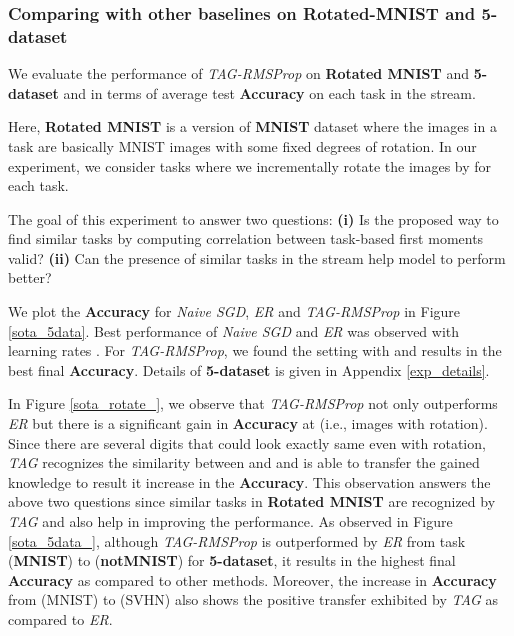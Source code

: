 \documentclass{article} \usepackage{collas2022_conference,times}
\begin{document}
    
\subsubsection{Comparing with other baselines on Rotated-MNIST and 5-dataset}\label{5data_rotated}
We evaluate the performance of \textit{TAG-RMSProp} on \textbf{Rotated MNIST}  and \textbf{5-dataset} and in terms of average test \textbf{Accuracy} on each task in the stream. 

Here, \textbf{Rotated MNIST} \citep{lopez2017gradient} is a version of \textbf{MNIST} dataset \citep{mnist} where the images in a task are basically MNIST images with some fixed degrees of rotation. In our experiment, we consider  tasks where we incrementally rotate the images by  for each task. 

The goal of this experiment to answer two questions: \textbf{(i)} Is the proposed way to find similar tasks by computing correlation between task-based first moments valid? \textbf{(ii)} Can the presence of similar tasks in the stream help model to perform better? 

We plot the \textbf{Accuracy} for \textit{Naive SGD}, \textit{ER} and \textit{TAG-RMSProp} in Figure \ref{sota_5data}. Best performance of \textit{Naive SGD} and \textit{ER} was observed with learning rates . For \textit{TAG-RMSProp}, we found the setting with  and  results in the best final \textbf{Accuracy}.
Details of \textbf{5-dataset} is given in Appendix \ref{exp_details}.

In Figure \ref{sota_rotate_}, we observe that \textit{TAG-RMSProp} not only outperforms \textit{ER} but there is a significant gain in \textbf{Accuracy} at  (i.e., images with  rotation). Since there are several digits that could look exactly same even with  rotation, \textit{TAG} recognizes the similarity between  and  and is able to transfer the gained knowledge to result it increase in the \textbf{Accuracy}. This observation answers the above two questions since similar tasks in \textbf{Rotated MNIST} are recognized by \textit{TAG} and also help in improving the performance. As observed in Figure \ref{sota_5data_}, although \textit{TAG-RMSProp} is outperformed by \textit{ER} from task  (\textbf{MNIST}) to  (\textbf{notMNIST}) for \textbf{5-dataset}, it results in the highest final \textbf{Accuracy} as compared to other methods. Moreover, the increase in \textbf{Accuracy} from  (MNIST) to  (SVHN) also shows the positive transfer exhibited by \textit{TAG} as compared to \textit{ER}.
\end{document}
